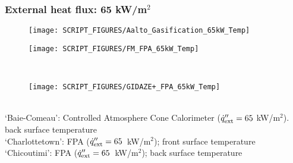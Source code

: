 \begin{landscape}
\subsubsection{External heat flux: 65 kW/m$^2$}
\begin{minipage}{0.65\textwidth}
\begin{figure}[H]
{\texttt{[image: SCRIPT\_FIGURES/Aalto\_Gasification\_65kW\_Temp]}}\\
\end{figure}
\end{minipage}
\begin{minipage}{0.35\textwidth}
\begin{figure}[H]
{\texttt{[image: SCRIPT\_FIGURES/FM\_FPA\_65kW\_Temp]}}\\
\end{figure}
\end{minipage}\\
\begin{minipage}{0.65\textwidth}
\begin{figure}[H]
{\texttt{[image: SCRIPT\_FIGURES/GIDAZE+\_FPA\_65kW\_Temp]}}\\
\end{figure}
\end{minipage}\\
‘Baie-Comeau’:  Controlled Atmosphere Cone Calorimeter ($\dot{q}_{\rm ext}'' = 65$ kW/m$^2$). back surface temperature \\
‘Charlottetown’:  FPA ($\dot{q}_{\rm ext}'' = 65$~kW/m$^2$); front surface temperature \\
‘Chicoutimi’:   FPA ($\dot{q}_{\rm ext}'' = 65$~kW/m$^2$); back surface temperature  \\

\end{landscape}

